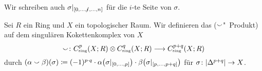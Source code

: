 \begin{bemerkung}[{name=[Schreibweise für Einschränkung auf eine Seite]}]
	Wir schreiben auch $\sigma|_{\benbrace*{0,\ldots , \slashedi, \ldots ,n}}$ für die $i$-te Seite von $\sigma$.
\end{bemerkung}

\begin{definition}[label=sec3:def_cup,{name=[Cup-Produkt]}]
	Sei $R$ ein Ring und $X$ ein topologischer Raum. 
	Wir definieren das  ($\cupp$"~Produkt) auf dem singulären Kokettenkomplex von $X$
	\[
		\cupp \colon C^p_\sing \enbrace*{X;R} \otimes C^q_\sing(X;R) \longrightarrow C^{p+q}_\sing \enbrace*{X;R}
	\]
	durch $(\alpha \cupp \beta)(\sigma) \coloneqq  (-1)^{p \cdot q} \cdot \alpha\enbrace*{\sigma|_{\benbrace{0,\ldots ,p}}} \cdot \beta \enbrace*{\sigma|_{\benbrace*{p, \ldots , p+q}}}$ für $\sigma \colon \abs{\Delta^{p+q}} \to X$.
\end{definition}

